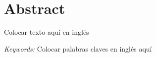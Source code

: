 \chapter*{Abstract}

Colocar texto aquí en inglés
\vspace{5mm}

\textit{Keywords:} Colocar palabras claves en inglés aquí
